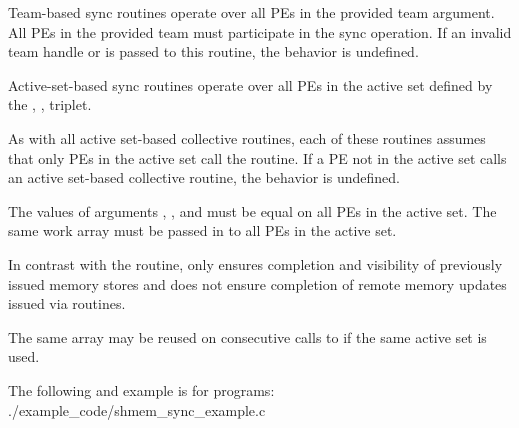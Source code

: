 \begin{apidefinition}
{    Team-based sync routines operate over all \acp{PE} in the provided team argument. All
    \acp{PE} in the provided team must participate in the sync operation.
    If an invalid team handle or 
    is passed to this routine, the behavior is undefined.

    Active-set-based sync routines operate over all \acp{PE} in the active set
    defined by the , ,  triplet.

    As with all active set-based collective routines,
    each of these routines assumes
    that only \acp{PE} in the active set call the routine.  If a \ac{PE} not in
    the active set calls an active set-based collective routine,
    the behavior is undefined.

    The values of arguments , , and
     must be equal on all \acp{PE} in the active set.  The same
    work array must be passed in  to all \acp{PE} in the active set.

    In contrast with the  routine,  only
    ensures completion and visibility of previously issued memory stores and does not ensure
    completion of remote memory updates issued via \openshmem routines.

    The same  array may be reused on consecutive calls to
     if the same active set is used.
}



\begin{apiexamples}

\apicexample
    {The following  and  example is
    for \Cstd[11] programs:}
    {./example_code/shmem_sync_example.c}
    {}

\end{apiexamples}

\end{apidefinition}
